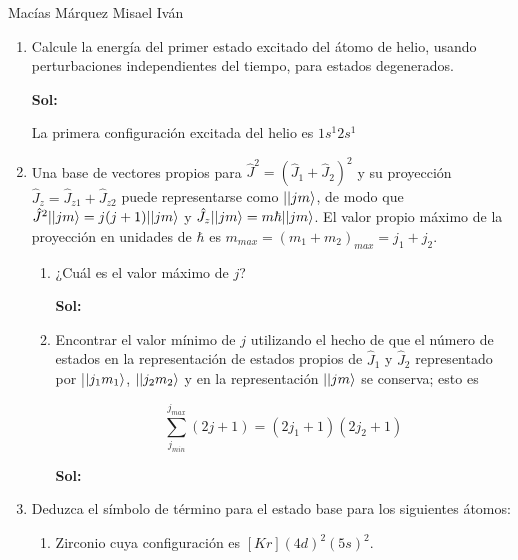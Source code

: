\documentclass[12pt,a4paper]{article}
\DeclarePairedDelimiter\ket{\lvert}{\rangle}
\begin{document}
Macías Márquez Misael Iván

\begin{enumerate}






\item Calcule la energía del primer estado excitado del átomo de helio, usando perturbaciones independientes del tiempo, para estados degenerados.

\textbf{Sol:}

La primera configuración excitada del helio es $1s^{1}2s^{1}$





\item Una base de vectores propios para $\hat{J}^{2}= (\hat{J}_1 + \hat{J}_2)^{2}$ y su proyección $\hat{J}_{z}= \hat{J}_{z1} + \hat{J}_{z2}$ puede representarse como $|\ket{jm}$, de modo que $\hat{J}^2|\ket{jm} = j(j+1)|\ket{jm}$ y $\hat{J}_{z} |\ket{jm} =m\hbar |\ket{jm}$. El valor propio máximo de la proyección en unidades de $\hbar$ es $m_{max}=(m_1 + m_2)_{max}=j_1 + j_2$.

\begin{enumerate}
    \item ¿Cuál es el valor máximo de $j$?
    
    \textbf{Sol:}
    
    
    \item Encontrar el valor mínimo de $j$ utilizando el hecho de que el número de estados en la representación de estados propios de $\hat{J}_1$ y $\hat{J}_2$ representado por |$\ket{j_1 m_1}$, $|\ket{j_2 m_2}$ y en la representación $|\ket{jm}$ se conserva; esto es
    
    \begin{equation*}
        \sum_{j_{min}}^{j_{max}}(2j+1)=(2j_1 + 1)(2j_2 +1)
    \end{equation*}
    
    \textbf{Sol:}
    
    
\end{enumerate}






\item Deduzca el símbolo de término para el estado base para los siguientes átomos:

\begin{enumerate}
    \item Zirconio cuya configuración es $[Kr](4d)^2(5s)^2$.
    

\end{enumerate}
\end{enumerate}
\end{document}

